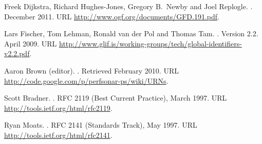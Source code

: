 \documentclass[12pt]{article}  %
\begin{document}
% 
\begin{thebibliography}{2}


Freek Dijkstra, Richard Hughes-Jones, Gregory B.\ Newby and Joel Replogle.
.
\newblock December 2011.
\newblock URL \url{http://www.ogf.org/documents/GFD.191.pdf}.

Lars Fischer, Tom Lehman, Ronald van der Pol and Thomas Tam.
.
\newblock Version 2.2. April 2009.
\newblock URL \url{http://www.glif.is/working-groups/tech/global-identifiers-v2.2.pdf}.


Aaron Brown (editor).
.
\newblock Retrieved February 2010.
\newblock URL \url{http://code.google.com/p/perfsonar-ps/wiki/URNs}.

Scott Bradner.
.
\newblock RFC 2119 (Best Current Practice), March 1997.
\newblock URL \url{http://tools.ietf.org/html/rfc2119}.

Ryan Moats.
.
\newblock RFC 2141 (Standards Track), May 1997.
\newblock URL \url{http://tools.ietf.org/html/rfc2141}.


\end{thebibliography}
\end{document}
